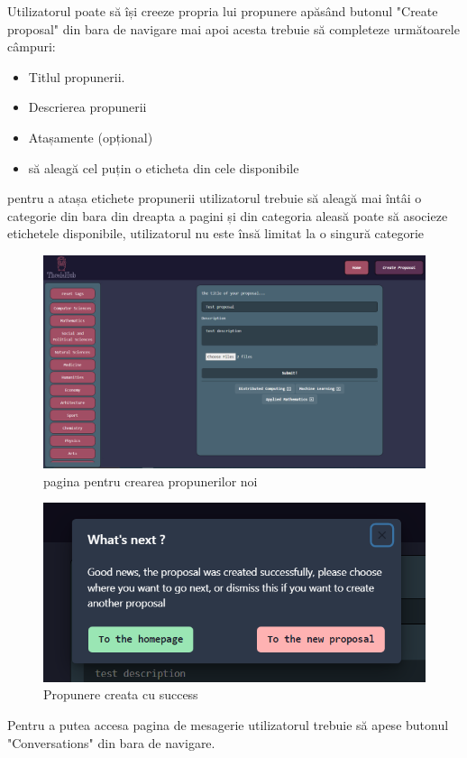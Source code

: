 \documentclass[12pt,a4paper,hidelinks]{report}
\theoremstyle{definition}
\theoremstyle{remark}
\begin{document}
Utilizatorul poate să își creeze propria lui propunere apăsând butonul "Create proposal" din bara de navigare
mai apoi acesta trebuie să completeze următoarele câmpuri:
\begin{itemize}
    \item Titlul propunerii.
    \item Descrierea propunerii
    \item Atașamente (opțional)
    \item să aleagă cel puțin o eticheta din cele disponibile
\end{itemize}
pentru a atașa etichete propunerii utilizatorul trebuie să aleagă mai întâi o categorie din bara din dreapta a pagini 
și din categoria aleasă poate să asocieze etichetele disponibile, utilizatorul nu este însă limitat la o singură categorie
\begin{figure}[H]
    \centering
    \includegraphics[scale=0.4]{images/CreateProposalPage.PNG}
    \caption{pagina pentru crearea propunerilor noi}
\end{figure}
\begin{figure}[H]
    \centering
    \includegraphics[scale=0.7]{images/ProposalCreated.PNG}
    \caption{Propunere creata cu success}
\end{figure}
Pentru a putea accesa pagina de mesagerie utilizatorul trebuie să apese butonul "Conversations" din bara de navigare.
\end{document}
